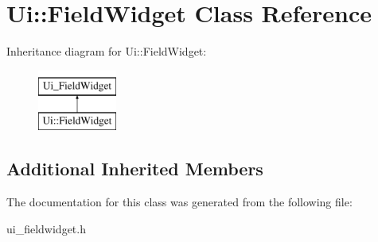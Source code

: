 \hypertarget{class_ui_1_1_field_widget}{}\section{Ui\+:\+:Field\+Widget Class Reference}
\label{class_ui_1_1_field_widget}
Inheritance diagram for Ui\+:\+:Field\+Widget\+:\begin{figure}[H]
\begin{center}
\leavevmode
\includegraphics[height=2.000000cm]{class_ui_1_1_field_widget}
\end{center}
\end{figure}
\subsection*{Additional Inherited Members}


The documentation for this class was generated from the following file\+:\begin{DoxyCompactItemize}
\item 
ui\+\_\+fieldwidget.\+h\end{DoxyCompactItemize}
